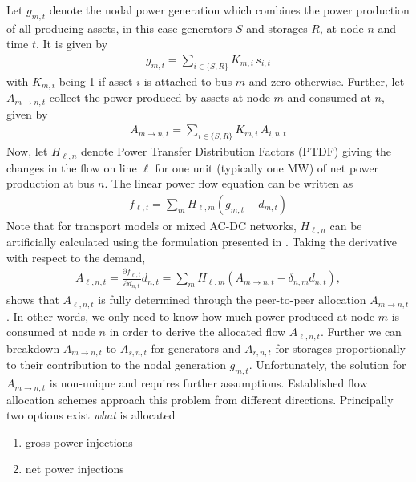 \documentclass[11pt,twocolumn]{article}
\newcommand{\Forall}[1]{\hspace{10pt} \forall \,\, #1 }
\newcommand{\pdv}[2]{\frac{\partial #1}{\partial #2}}
\newcommand{\state}{s_{i,t}}
\newcommand{\generation}{g_{s,t}}
\newcommand{\nodalgeneration}[1][n]{g_{#1,t}}
\newcommand{\flow}{f_{\ell,t}}
\newcommand{\storage}{g_{r,t}}
\newcommand{\storagedispatch}{\storage^\text{dis}}
\newcommand{\demand}[1][n]{d_{#1,t}}
\newcommand{\incidencegenerator}[1][n]{K_{#1,s}}
\newcommand{\incidencestorage}[1][n]{K_{#1,r}}
\newcommand{\incidenceasset}[1][n]{K_{#1,i}}
\newcommand{\ptdf}[1][n]{H_{\ell,#1}}
\newcommand{\allocategeneration}[1][s, n]{A_{#1,t}}
\newcommand{\allocatestoragedispatch}[1][r, n]{A_{#1,t}}
\newcommand{\allocatepeer}[1][m \rightarrow n]{A_{#1,t}}
\newcommand{\allocateflow}[1][n]{A_{\ell,#1,t}}
\newcommand{\allocatestate}[1][i, n]{A_{#1,t}}
\begin{document}
Let $\nodalgeneration[m]$ denote the nodal power generation which combines the power production of all producing assets, in this case generators $S$ and storages $R$, at node $n$ and time $t$. It is given by 
\begin{align}
    \nodalgeneration[m] = \sum_{i \in \{S, R\}} \incidenceasset[m] \, \state
\end{align}
with $\incidenceasset[m]$ being 1 if asset $i$ is attached to bus $m$ and zero otherwise. Further, let $\allocatepeer$ collect the power produced by assets at node $m$ and consumed at $n$, given by 
\begin{align}
    \allocatepeer = \sum_{i \in \{S,R\}} \incidenceasset[m] \, \allocatestate  
\end{align}
Now, let $\ptdf$ denote Power Transfer Distribution Factors (PTDF) giving the changes in the flow on line $\ell$ for one unit (typically one MW) of net power production at bus $n$. The linear power flow equation can be written as 
\begin{align}
 \flow  = \sum_m \ptdf[m] \left( \nodalgeneration[m] - \demand[m] \right)  
\end{align}
Note that for transport models or mixed AC-DC networks, $\ptdf$ can be artificially calculated using the formulation presented in \cite{hofmann_flow_2020-1}.
Taking the derivative with respect to the demand, 
\begin{align}
 \allocateflow = \pdv{\flow}{\demand} \demand = \sum_m \ptdf[m] \left( \allocatepeer  - \delta_{n,m} \demand \right) 
 \label{eq:allocate_peer_to_allocate_flow},
\end{align}
shows that $\allocateflow$ is fully determined through the peer-to-peer allocation $\allocatepeer$. In other words, we only need to know how much power produced at node $m$ is consumed at node $n$ in order to derive the allocated flow $\allocateflow$. Further we can breakdown $\allocatepeer$ to $\allocategeneration$ for generators and $\allocatestoragedispatch$ for storages proportionally to their contribution to the nodal generation $\nodalgeneration[m]$. Unfortunately, the solution for $\allocatepeer$ is non-unique and requires further assumptions. Established flow allocation schemes approach this problem from different directions. Principally two options exist \textit{what} is allocated 
% 
\begin{enumerate}
\item gross power injections \label{gross}
\item net power injections \label{net}
\end{enumerate}
\end{document}
